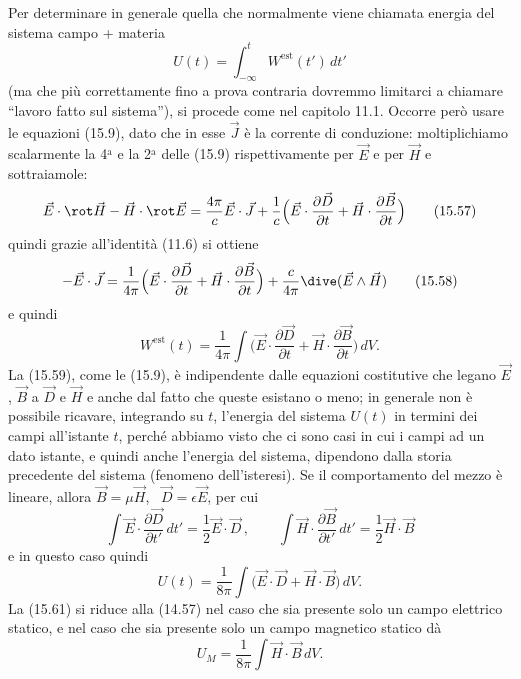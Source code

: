 Per determinare in generale quella che normalmente viene chiamata energia del
sistema campo + materia
\begin{equation}
  U(t)=\int_{-\infty}^tW^\mathrm{est}(t')\,dt'
  \tag{15.56}
\end{equation}
(ma che pi\`u correttamente fino a prova contraria dovremmo limitarci a chiamare
``lavoro fatto sul sistema''), si procede come nel capitolo 11.1. Occorre per\`o
usare le equazioni (15.9), dato che in esse $\vec J$ \`e la corrente di
conduzione: moltiplichiamo scalarmente la 4$^\mathrm{a}$ e la 2$^\mathrm{a}$
delle (15.9) rispettivamente per $\vec E$ e per $\vec H$ e sottraiamole:
\begin{equation}
  \vec E\cdot\rot\vec H-\vec H\cdot\rot\vec E=\frac{4\pi}{c}\vec E\cdot\vec J
  +\frac1c\Big(\vec E\cdot\frac{\partial\vec D}{\partial t}
  +\vec H\cdot\frac{\partial\vec B}{\partial t}\Big)
  \tag{15.57}
\end{equation}
quindi grazie all'identit\`a (11.6) si ottiene
\begin{equation}
  -\vec E\cdot\vec J
  =\frac{1}{4\pi}\Big(\vec E\cdot\frac{\partial\vec D}{\partial t}
  +\vec H\cdot\frac{\partial\vec B}{\partial t}\Big)
  +\frac{c}{4\pi}\dive(\vec E\wedge\vec H)
  \tag{15.58}
\end{equation}
e quindi
\begin{equation}
  W^\mathrm{est}(t)
  =\frac{1}{4\pi}\int\Big(\vec E\cdot\frac{\partial\vec D}{\partial t}
  +\vec H\cdot\frac{\partial\vec B}{\partial t}\Big)\,dV.
  \tag{15.59}
\end{equation}
La (15.59), come le (15.9), \`e indipendente dalle equazioni costitutive che
legano $\vec E$, $\vec B$ a $\vec D$ e $\vec H$ e anche dal fatto che queste
esistano o meno; in generale non \`e possibile ricavare, integrando su $t$,
l'energia del sistema $U(t)$ in termini dei campi all'istante $t$, perch\'e
abbiamo visto che ci sono casi in cui i campi ad un dato istante, e quindi anche
l'energia del sistema, dipendono dalla storia precedente del sistema (fenomeno
dell'isteresi). Se il comportamento del mezzo \`e lineare, allora
$\vec B=\mu\vec H$, \ $\vec D=\epsilon\vec E$, per cui
\begin{equation}
  \int\vec E\cdot\frac{\partial\vec D}{\partial t'}\,dt'
  =\frac12\vec E\cdot\vec D\,,
  \qquad\int\vec H\cdot\frac{\partial\vec B}{\partial t'}\,dt'
  =\frac12\vec H\cdot\vec B
  \tag{15.60}
\end{equation}
e in questo caso quindi
\begin{equation}
  U(t)=\frac{1}{8\pi}\int\big(\vec E\cdot\vec D+\vec H\cdot\vec B\big)\,dV.
  \tag{15.61}
\end{equation}
La (15.61) si riduce alla (14.57) nel caso che sia presente solo un campo
elettrico statico, e nel caso che sia presente solo un campo magnetico statico
d\`a
\begin{equation}
  U_M=\frac{1}{8\pi}\int\vec H\cdot\vec B\,dV.
  \tag{15.62}
\end{equation}

